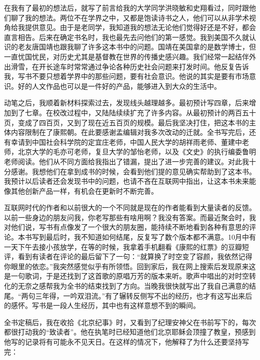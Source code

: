 
在我有了最初的想法后，就写了前言给我的大学同学洪晓敏和史翔看过，同时跟他们聊了我的想法。两位不在学界之中，又都是饱读诗书之人，他们可以从非学术视角给我提供意见。由于是老同学，我知道我的想法无论他们觉得好还是不好，都会直言相告。后来在确定书名时，我也最先去问他们的第一感觉。我到美国不久就认识的老友唐国靖也跟我聊了许多这本书中的问题。国靖在美国拿的是数学博士，但一直忧国忧民，对历史尤其是基督教在世界的传播史感兴趣。我们经常一起结伴外出滑雪，在开长途车时常常通过争论各种历史社会问题来打发时间。他反复告诉我，写书不要只想着学界中的那些问题，要有社会意识。他说的其实是要有市场意识。好的人文作品也可以是一件好的产品，能够进入到大众的生活中。



动笔之后，我顺着新材料探索过去，发现线头越理越多。最初预计写四章，后来增加到了七章。在校改过程中，又陆陆续续扩充了许多内容。从最初预计的两百五十页，变成了四百页，又到了现在近五百页的规模。最后我坚决打住，把这本书的主体内容限制在了康熙朝。在此要感谢孟编辑对我多次改动的迁就。全书写完后，还有幸请到中国社会科学院的定宜庄老师，中国人民大学的胡祥雨老师、董建中老师，北京大学的毛亦可老师，复旦大学的邹怡老师，以及《文史》的执行编委鲁明老师阅读。他们从不同方面给我指出了错漏，提出了进一步完善的建议。对此我十分感谢。我想他们在拿到成书的时候，会看到他们提的意见确实帮助到了这本书。我预计以后读者还会发现书中的问题，也请不吝在互联网中指出，让这本书未来能像其他创新产品一样，有机会在更新时不断完善。



互联网时代的作者和以前很大的一个不同就是现在的作者能看到大量读者的反馈。以前一些身边的朋友问我，你老写那些有啥用啊？我没有答案。而最近聚会时，我对他们说，写书有点像发了一个很大的朋友圈，能持续不断地看到各种有意思的评论。本书写到最后时，我不知道如何结尾，反复写了数个版本都不满意。10月中有一天下午去接小孩放学，在等的时候，我拿着手机翻看《康熙的红票》的豆瓣短评，看到有读者在评论的最后留下了一句：“就算换了时空变了容颜，我依然记得你眼里的依恋。”我突然感觉似乎有所领悟。回到家后，我在网上搜索后发现原来这是一句歌词，于是还找到了这首歌的原唱万芳的版本来听。歌声中唱出的对时空转化的无奈之感帮我为全书的结束找到了方向。当晚我很快就写出了我自己满意的结尾。“两句三年得，一吟双泪流。”有了辗转反侧写不出的经历，也才有这写出来后的感怀。写书是一段人生经历，其中也有这样意想不到的瞬间。



全书定稿后，我在收拾《北京纪事》时，又看到了纪理安神父在书前写下的，每次都很打动我的“致读者”。他在执笔时已经知道他们北京耶稣会顶撞了教皇，预感到他写的记录将有可能永不见天日。在这样的情况下，他解释了为什么还要坚持写完：


